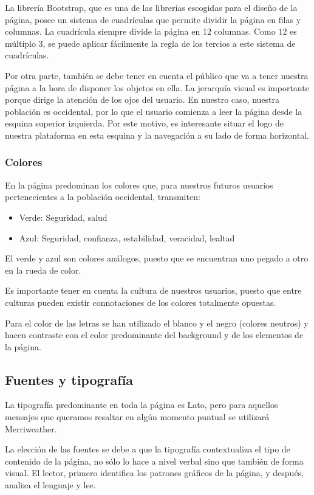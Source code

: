 La librería Bootstrap, que es una de las librerías escogidas para el diseño de la página, posee un sistema de cuadrículas\cite{bootstrap_grid_basic} que permite dividir la página en filas y columnas. La cuadrícula siempre divide la página en 12 columnas. Como 12 es múltiplo 3, se puede aplicar fácilmente la regla de los tercios a este sistema de cuadrículas.


Por otra parte, también se debe tener en cuenta el público que va a tener nuestra página a la hora de disponer los objetos en ella. La jerarquía visual es importante porque dirige la atención de los ojos del usuario. En nuestro caso, nuestra población es occidental, por lo que el usuario comienza a leer la página desde la esquina superior izquierda. Por este motivo, es interesante situar el logo de nuestra plataforma en esta esquina y la navegación a su lado de forma horizontal.


\subsubsection{Colores}
En la página predominan los colores que, para nuestros futuros usuarios pertenecientes a la población occidental, transmiten:


\begin{itemize}
\item Verde: Seguridad, salud
\item Azul: Seguridad, confianza, estabilidad, veracidad, lealtad
\end{itemize}


El verde y azul son colores análogos, puesto que se encuentran uno pegado a otro en la rueda de color.


Es importante tener en cuenta la cultura de nuestros usuarios, puesto que entre culturas   pueden existir connotaciones de los colores totalmente opuestas.


Para el color de las letras se han utilizado el blanco y el negro (colores neutros) y hacen contraste con el color predominante del background y de los elementos de la página.


\subsection{Fuentes y tipografía}
La tipografía predominante en toda la página es Lato\cite{lato}, pero para aquellos mensajes que queramos resaltar en algún momento puntual se utilizará Merriweather\cite{merriweather}.


La elección de las fuentes se debe a que la tipografía contextualiza el tipo de contenido de la página, no sólo lo hace a nivel verbal sino que también de forma visual. El lector, primero identifica los patrones gráficos de la página, y después, analiza el lenguaje y lee.


